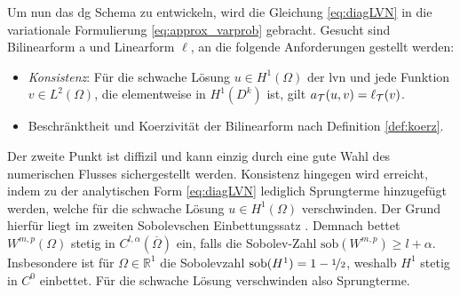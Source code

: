 Um nun das \ac{dg} Schema zu entwickeln, wird die Gleichung \eqref{eq:diagLVN} in die variationale Formulierung \eqref{eq:approx_varprob} gebracht. Gesucht sind Bilinearform a und Linearform $\ell$, an die folgende Anforderungen gestellt werden:
\begin{itemize}
  \item \emph{Konsistenz}: Für die schwache Lösung $u\in H^1(\Omega)$ der \ac{lvn} und jede Funktion $v\in L^2(\Omega)$, die elementweise in $H^1(D^k)$ ist, gilt ${a_{\mathcal{T}}(u,v)=\ell_{\mathcal{T}}(v)}$.
  \item Beschränktheit und Koerzivität der Bilinearform nach Definition \ref{def:koerz}.
\end{itemize}
Der zweite Punkt ist diffizil und kann einzig durch eine gute Wahl des numerischen Flusses sichergestellt werden.
Konsistenz hingegen wird erreicht, indem zu der analytischen Form \eqref{eq:diagLVN} lediglich Sprungterme hinzugefügt werden, welche für die schwache Lösung $u\in H^1(\Omega)$ verschwinden. Der Grund hierfür liegt im zweiten Sobolevschen Einbettungssatz \cite{buchPietro}. Demnach bettet $W^{m,p}(\Omega)$ stetig in $C^{l,\alpha}(\overline{\Omega})$ ein, falls die Sobolev-Zahl ${\text{sob}(W^{m,p})\geq l+\alpha}$.
Insbesondere ist für $\Omega\in\mathbb{R}^1$ die Sobolevzahl $\text{sob}(H^1) = 1-\nicefrac{1}{2}$, weshalb $H^1$ stetig in $C^0$ einbettet. Für die schwache Lösung verschwinden also Sprungterme.

